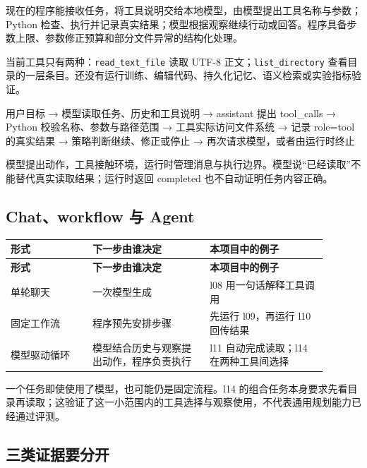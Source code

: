 \documentclass[UTF8,zihao=-4,fontset=fandol]{ctexart}
\begin{document}
现在的程序能接收任务，将工具说明交给本地模型，由模型提出工具名称与参数；Python 检查、执行并记录真实结果；模型根据观察继续行动或回答。程序具备步数上限、参数修正预算和部分文件异常的结构化处理。

当前工具只有两种：\nolinkurl{read_text_file} 读取 UTF-8 正文；\nolinkurl{list_directory} 查看目录的一层条目。还没有运行训练、编辑代码、持久化记忆、语义检索或实验指标验证。

\begin{Code}
用户目标
  → 模型读取任务、历史和工具说明
  → assistant 提出 tool_calls
  → Python 校验名称、参数与路径范围
  → 工具实际访问文件系统
  → 记录 role=tool 的真实结果
  → 策略判断继续、修正或停止
  → 再次请求模型，或者由运行时终止
\end{Code}

模型提出动作，工具接触环境，运行时管理消息与执行边界。模型说“已经读取”不能替代真实读取结果；运行时返回 completed 也不自动证明任务内容正确。

\subsection{Chat、workflow 与 Agent}

{\small\setlength{\tabcolsep}{4pt}
\renewcommand{\arraystretch}{1.25}
\begin{longtable}{>{\raggedright\arraybackslash}p{0.23\linewidth}>{\raggedright\arraybackslash}p{0.33\linewidth}>{\raggedright\arraybackslash}p{0.33\linewidth}}
\toprule
\textbf{形式} & \textbf{下一步由谁决定} & \textbf{本项目中的例子} \\
\midrule\endfirsthead
\toprule
\textbf{形式} & \textbf{下一步由谁决定} & \textbf{本项目中的例子} \\
\midrule\endhead
\bottomrule\endfoot
单轮聊天 & 一次模型生成 & l08 用一句话解释工具调用 \\
固定工作流 & 程序预先安排步骤 & 先运行 l09，再运行 l10 回传结果 \\
模型驱动循环 & 模型结合历史与观察提出动作，程序负责执行 & l11 自动完成读取；l14 在两种工具间选择 \\
\end{longtable}}

一个任务即使使用了模型，也可能仍是固定流程。l14 的组合任务本身要求先看目录再读取；这验证了这一小范围内的工具选择与观察使用，不代表通用规划能力已经通过评测。

\subsection{三类证据要分开}
\end{document}
